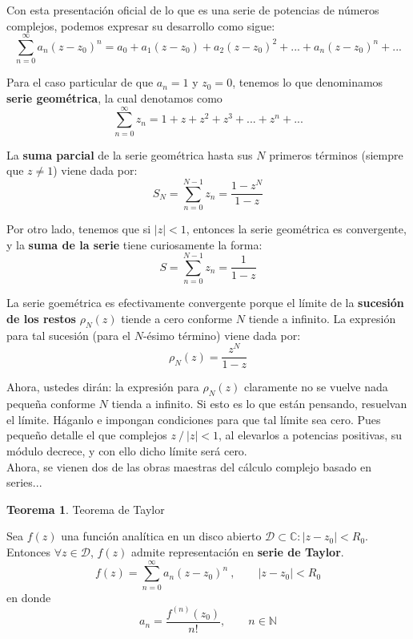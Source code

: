 \documentclass[12pt]{article}
\theoremstyle{definition}
\theoremstyle{theorem}
\newtheorem{theorem}{Teorema}[section]
\theoremstyle{corolary}
\theoremstyle{method}
\begin{document}
Con esta presentaci\'on oficial de lo que es una serie de potencias de n\'umeros complejos, podemos expresar su desarrollo como sigue: $$\sum\limits_{n=0}^{\infty}a_n(z-z_0)^n = a_0 + a_1(z-z_0)+a_2(z-z_0)^2+...+a_n(z-z_0)^n+...$$

Para el caso particular de que $a_n = 1$ y $z_0=0$, tenemos lo que denominamos \textbf{serie geom\'etrica}, la cual denotamos como $$\sum\limits_{n=0}^{\infty}z_n = 1+z+z^2+z^3+...+z^n+...$$

La \textbf{suma parcial} de la serie geom\'etrica hasta sus $N$ primeros t\'erminos (siempre que $z\neq 1$) viene dada por: $$S_N = \sum\limits_{n=0}^{N-1}z_n = \frac{1-z^N}{1-z}$$

Por otro lado, tenemos que si $|z|<1$, entonces la serie geom\'etrica es convergente, y la \textbf{suma de la serie} tiene curiosamente la forma: $$S = \sum\limits_{n=0}^{N-1}z_n = \frac{1}{1-z}$$

La serie goem\'etrica es efectivamente convergente porque el l\'imite de la \textbf{sucesi\'on de los restos} $\rho_N(z)$ tiende a cero conforme $N$ tiende a infinito. La expresi\'on para tal sucesi\'on (para el $N$-\'esimo t\'ermino) viene dada por: $$\rho_N(z)=\frac{z^N}{1-z}$$

Ahora, ustedes dir\'an: la expresi\'on para $\rho_N(z)$ claramente no se vuelve nada peque\~na conforme $N$ tienda a infinito. Si esto es lo que est\'an pensando, resuelvan el l\'imite. H\'aganlo e impongan condiciones para que tal l\'imite sea cero. Pues peque\~no detalle el que complejos $z\ /\ |z|<1$, al elevarlos a potencias positivas, su m\'odulo decrece, y con ello dicho l\'imite ser\'a cero.\\

Ahora, se vienen dos de las obras maestras del c\'alculo complejo basado en series...\\

\colorbox{blue!40!white!80}{\parbox{\linewidth}{
\theoremstyle{theorem}
\begin{theorem} {Teorema de Taylor}

Sea $f(z)$ una funci\'on anal\'itica en un disco abierto $\mathcal{D} \subset \mathbb{C}: |z-z_0|<R_0$. Entonces $\forall z\in \mathcal{D}$, $f(z)$ admite representaci\'on en \textbf{serie de Taylor}.
$$f(z)=\sum\limits_{n=0}^{\infty}a_n(z-z_0)^n\ ,\qquad |z-z_0|<R_0$$
en donde $$a_n=\frac{f^{(n)}(z_0)}{n!}, \qquad n\in \mathbb{N}$$
\end{theorem}}}
\linebreak
\linebreak
\end{document}
